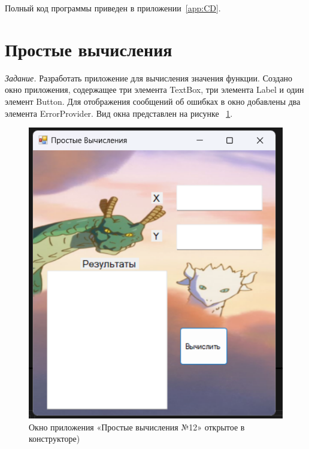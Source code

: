 \documentclass[bachelor, och, pract, times]{SCWorks}
\begin{document}
Полный код программы приведен в приложении~\ref{app:CD}.

\section{Простые вычисления}

\textsl{Задание.} Разработать приложение для вычисления значения функции.
Создано окно приложения, содержащее три элемента TextBox, три элемента Label и один элемент Button. Для отображения сообщений об ошибках в
окно добавлены два элемента ErrorProvider. Вид окна представлен на рисунке ~\ref{fig:simple-01}.


\begin{figure}[!ht]
    \centering
    \includegraphics[scale=0.7]{Скрины/Снимок экрана 2025-01-03 212123.png}
    \caption{Окно приложения «Простые вычисления №12» открытое в конструкторе)}\label{fig:simple-01}
\end{figure}
\end{document}
